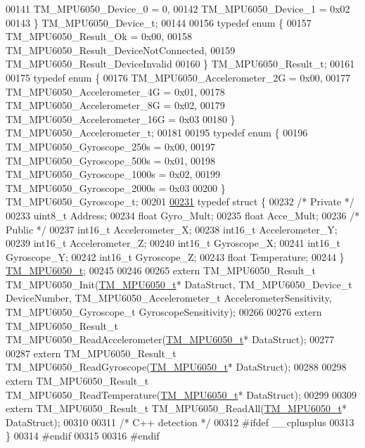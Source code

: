 \begin{DoxyCode}
00141     TM\_MPU6050\_Device\_0 = 0,
00142     TM\_MPU6050\_Device\_1 = 0x02
00143 \} TM\_MPU6050\_Device\_t;
00144 
00156 \textcolor{keyword}{typedef} \textcolor{keyword}{enum} \{
00157     TM\_MPU6050\_Result\_Ok = 0x00,
00158     TM\_MPU6050\_Result\_DeviceNotConnected,
00159     TM\_MPU6050\_Result\_DeviceInvalid
00160 \} TM\_MPU6050\_Result\_t;
00161 
00175 \textcolor{keyword}{typedef} \textcolor{keyword}{enum} \{
00176     TM\_MPU6050\_Accelerometer\_2G = 0x00,
00177     TM\_MPU6050\_Accelerometer\_4G = 0x01,
00178     TM\_MPU6050\_Accelerometer\_8G = 0x02,
00179     TM\_MPU6050\_Accelerometer\_16G = 0x03
00180 \} TM\_MPU6050\_Accelerometer\_t;
00181 
00195 \textcolor{keyword}{typedef} \textcolor{keyword}{enum} \{
00196     TM\_MPU6050\_Gyroscope\_250s = 0x00,
00197     TM\_MPU6050\_Gyroscope\_500s = 0x01,
00198     TM\_MPU6050\_Gyroscope\_1000s = 0x02,
00199     TM\_MPU6050\_Gyroscope\_2000s = 0x03
00200 \} TM\_MPU6050\_Gyroscope\_t;
00201 
\hypertarget{tm__stm32f4__mpu6050_8h_source_l00231}{}\hyperlink{struct_t_m___m_p_u6050__t}{00231} \textcolor{keyword}{typedef} \textcolor{keyword}{struct }\{
00232     \textcolor{comment}{/* Private */}
00233     uint8\_t Address;
00234     \textcolor{keywordtype}{float} Gyro\_Mult;
00235     \textcolor{keywordtype}{float} Acce\_Mult;
00236     \textcolor{comment}{/* Public */}
00237     int16\_t Accelerometer\_X;
00238     int16\_t Accelerometer\_Y;
00239     int16\_t Accelerometer\_Z;
00240     int16\_t Gyroscope\_X;
00241     int16\_t Gyroscope\_Y;
00242     int16\_t Gyroscope\_Z;
00243     \textcolor{keywordtype}{float} Temperature;
00244 \} \hyperlink{struct_t_m___m_p_u6050__t}{TM\_MPU6050\_t};
00245 
00246 
00265 \textcolor{keyword}{extern} TM\_MPU6050\_Result\_t TM\_MPU6050\_Init(\hyperlink{struct_t_m___m_p_u6050__t}{TM\_MPU6050\_t}* DataStruct, TM\_MPU6050\_Device\_t 
      DeviceNumber, TM\_MPU6050\_Accelerometer\_t AccelerometerSensitivity, TM\_MPU6050\_Gyroscope\_t GyroscopeSensitivity);
00266 
00276 \textcolor{keyword}{extern} TM\_MPU6050\_Result\_t TM\_MPU6050\_ReadAccelerometer(\hyperlink{struct_t_m___m_p_u6050__t}{TM\_MPU6050\_t}* DataStruct);
00277 
00287 \textcolor{keyword}{extern} TM\_MPU6050\_Result\_t TM\_MPU6050\_ReadGyroscope(\hyperlink{struct_t_m___m_p_u6050__t}{TM\_MPU6050\_t}* DataStruct);
00288 
00298 \textcolor{keyword}{extern} TM\_MPU6050\_Result\_t TM\_MPU6050\_ReadTemperature(\hyperlink{struct_t_m___m_p_u6050__t}{TM\_MPU6050\_t}* DataStruct);
00299 
00309 \textcolor{keyword}{extern} TM\_MPU6050\_Result\_t TM\_MPU6050\_ReadAll(\hyperlink{struct_t_m___m_p_u6050__t}{TM\_MPU6050\_t}* DataStruct);
00310 
00311 \textcolor{comment}{/* C++ detection */}
00312 \textcolor{preprocessor}{#ifdef \_\_cplusplus}
00313 \}
00314 \textcolor{preprocessor}{#endif}
00315 
00316 \textcolor{preprocessor}{#endif}
\end{DoxyCode}
